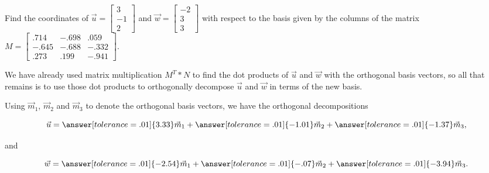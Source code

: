 \documentclass{ximera}
\begin{document}
  \begin{example}
   Find the coordinates of $\vec{u}=\begin{bmatrix}
   3\\-1\\2
   \end{bmatrix}$ and $\vec{w}=\begin{bmatrix}
      -2\\3\\3
   \end{bmatrix}$ with respect to the basis given by the columns of the matrix $M=\begin{bmatrix}
      .714 & -.698 &.059\\-.645&-.688&-.332\\.273&.199&-.941
   \end{bmatrix}$. 

   \begin{solution}
   
      We have already used matrix multiplication $M^T*N$ to find the dot products of $\vec{u}$ and $\vec{w}$ with the orthogonal basis vectors, so all that remains is to use those dot products to orthogonally decompose $\vec{u}$ and $\vec{w}$ in terms of the new basis. 

      Using $\vec{m}_1$, $\vec{m}_2$ and $\vec{m}_3$ to denote the orthogonal basis vectors, we have the orthogonal decompositions

      $$\vec{u}=\answer[tolerance=.01]{3.33}\vec{m}_1+\answer[tolerance=.01]{-1.01}\vec{m}_2+\answer[tolerance=.01]{-1.37}\vec{m}_3,$$

      and

      $$\vec{w}=\answer[tolerance=.01]{-2.54}\vec{m}_1+\answer[tolerance=.01]{-.07}\vec{m}_2+\answer[tolerance=.01]{-3.94}\vec{m}_3.$$

   \end{solution}
  \end{example}


      
\end{document}
